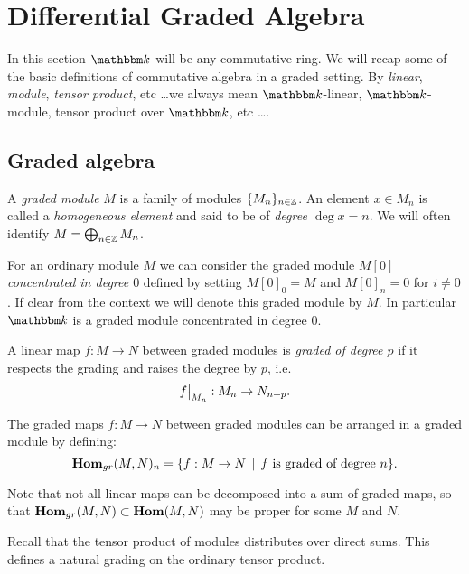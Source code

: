 
\section{Differential Graded Algebra}
\label{sec:algebra}

In this section $\k$ will be any commutative ring. We will recap some of the basic definitions of commutative algebra in a graded setting. By \emph{linear}, \emph{module}, \emph{tensor product}, etc \dots we always mean $\k$-linear, $\k$-module, tensor product over $\k$, etc \dots.

\subsection{Graded algebra}

\begin{definition}
	A \emph{graded module} $M$ is a family of modules $\{M_n\}_{n\in\mathbb{Z}}$. An element $x \in M_n$ is called a \emph{homogeneous element} and said to be of \emph{degree $\deg{x} = n$}. We will often identify $M = \bigoplus_{n \in \mathbb{Z}} M_n$.
\end{definition}

For an ordinary module $M$ we can consider the graded module $M[0]$ \emph{concentrated in degree $0$} defined by setting $M[0]_0 = M$ and $M[0]_n = 0$ for $i \neq 0$. If clear from the context we will denote this graded module by $M$. In particular $\k$ is a graded module concentrated in degree $0$.

\begin{definition}
	A linear map $f: M \to N$ between graded modules is \emph{graded of degree $p$} if it respects the grading and raises the degree by $p$, i.e.
	$$ \restr{f}{M_n} : M_n \to N_{n+p}. $$
\end{definition}

\begin{definition}
	The graded maps $f: M \to N$ between graded modules can be arranged in a graded module by defining:
	$$ \mathbf{Hom}_{gr}(M, N)_n = \{ f: M \to N \,\mid\, f \text{ is graded of degree } n \}. $$
\end{definition}

Note that not all linear maps can be decomposed into a sum of graded maps, so that $\mathbf{Hom}_{gr}(M, N) \subset \mathbf{Hom}(M, N)$ may be proper for some $M$ and $N$.

Recall that the tensor product of modules distributes over direct sums. This defines a natural grading on the ordinary tensor product.

